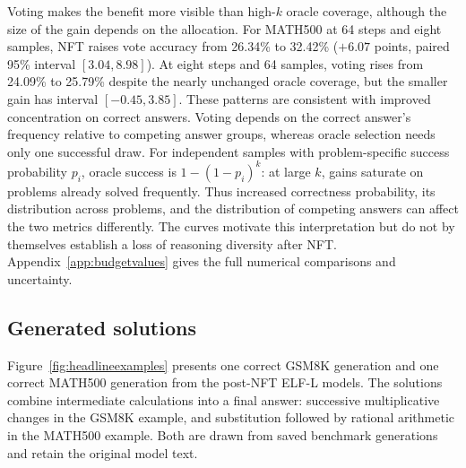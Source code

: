 Voting makes the benefit more visible than high-$k$ oracle coverage, although the size of the gain depends on the allocation. For MATH500 at 64 steps and eight samples, NFT raises vote accuracy from 26.34\% to 32.42\% ($+6.07$ points, paired 95\% interval $[3.04,8.98]$). At eight steps and 64 samples, voting rises from 24.09\% to 25.79\% despite the nearly unchanged oracle coverage, but the smaller gain has interval $[-0.45,3.85]$. These patterns are consistent with improved concentration on correct answers. Voting depends on the correct answer's frequency relative to competing answer groups, whereas oracle selection needs only one successful draw. For independent samples with problem-specific success probability $p_i$, oracle success is $1-(1-p_i)^k$: at large $k$, gains saturate on problems already solved frequently. Thus increased correctness probability, its distribution across problems, and the distribution of competing answers can affect the two metrics differently. The curves motivate this interpretation but do not by themselves establish a loss of reasoning diversity after NFT. Appendix~\ref{app:budgetvalues} gives the full numerical comparisons and uncertainty.

\subsection{Generated solutions}

Figure~\ref{fig:headlineexamples} presents one correct GSM8K generation and one correct MATH500 generation from the post-NFT ELF-L models. The solutions combine intermediate calculations into a final answer: successive multiplicative changes in the GSM8K example, and substitution followed by rational arithmetic in the MATH500 example. Both are drawn from saved benchmark generations and retain the original model text.
